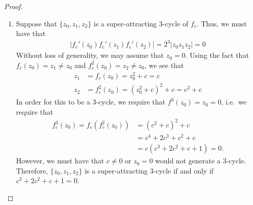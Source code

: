 \begin{proof}
\begin{enumerate}
    \item Suppose that $\{z_0, z_1, z_2\}$ is a super-attracting 3-cycle of $f_c$.
      Thus, we must have that
      \begin{align*}
        \left|f_c'(z_0)f_c'(z_1)f_c'(z_2)\right| = 2^3 \left|z_0z_1z_2\right| = 0
      \end{align*}
      Without loss of generality, we may assume that $z_0 = 0$.
      Using the fact that $f_c(z_0) = z_1 \neq z_0$ and $f_c^2(z_0) = z_2 \neq z_0$,
      we see that
      \begin{align*}
        z_1 &= f_c(z_0) = z_0^2 + c = c \\
        z_2 &= f_c^2(z_0) = (z_0^2 + c)^2 + c = c^2 + c
      \end{align*}
      In order for this to be a 3-cycle, we require that $f^3(z_0) = z_0 = 0$, i.e.\
      we require that
      \begin{align*}
        f_c^3(z_0) = f_c(f_c^2(z_0)) &= (c^2 + c)^2 + c \\
        &= c^4 + 2c^3 + c^2 + c \\
        &= c(c^3 + 2c^2 + c + 1) = 0.
      \end{align*}
      However, we must have that $c \neq 0$ or $z_0 = 0$ would not generate a 3-cycle. Therefore,
      $\{z_0, z_1, z_2\}$ is a super-attracting 3-cycle if and only if $c^3 + 2c^2 + c + 1 = 0$.
  \end{enumerate}
\end{proof}
\newpage
